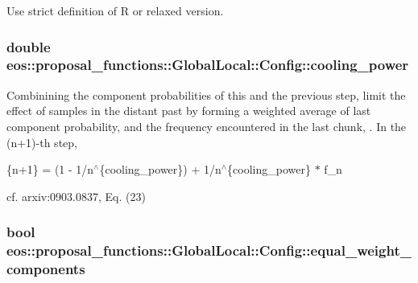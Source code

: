 Use strict definition of R or relaxed version. \hypertarget{structeos_1_1proposal__functions_1_1GlobalLocal_1_1Config_afc5df7dfbda07b6296b48bb3147f91ab}{
\subsubsection[{cooling\_\-power}]{\setlength{\rightskip}{0pt plus 5cm}double {\bf eos::proposal\_\-functions::GlobalLocal::Config::cooling\_\-power}}}
\label{structeos_1_1proposal__functions_1_1GlobalLocal_1_1Config_afc5df7dfbda07b6296b48bb3147f91ab}
Combinining the component probabilities of this and the previous step, limit the effect of samples in the distant past by forming a weighted average of last component probability,  and the frequency encountered in the last chunk, . In the (n+1)-\/th step,

\{n+1\} = (1 -\/ 1/n$^\wedge$\{cooling\_\-power\})  + 1/n$^\wedge$\{cooling\_\-power\} $\ast$ f\_\-n

cf. arxiv:0903.0837, Eq. (23) \hypertarget{structeos_1_1proposal__functions_1_1GlobalLocal_1_1Config_aafced70f6b662a177bdb7697cf107065}{
\subsubsection[{equal\_\-weight\_\-components}]{\setlength{\rightskip}{0pt plus 5cm}bool {\bf eos::proposal\_\-functions::GlobalLocal::Config::equal\_\-weight\_\-components}}}
\label{structeos_1_1proposal__functions_1_1GlobalLocal_1_1Config_aafced70f6b662a177bdb7697cf107065}


